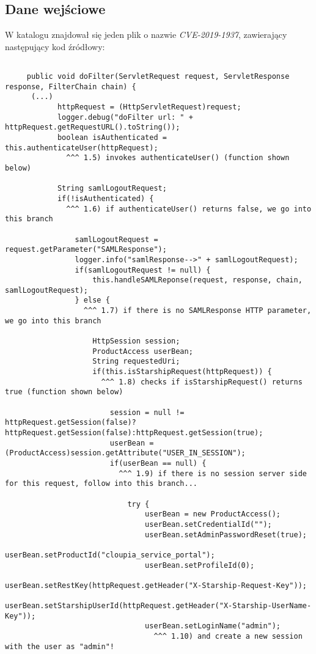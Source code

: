 \subsection{Dane wejściowe}
\label{subsec:dane_wejsciowe_i_oczekiwane_wyniki}
W katalogu znajdował się jeden plik o nazwie \textit{CVE-2019-1937}, zawierający następujący kod źródłowy:
\begin{listing}
    \begin{verbatim}
     
     public void doFilter(ServletRequest request, ServletResponse response, FilterChain chain) {
      (...)
            httpRequest = (HttpServletRequest)request;
            logger.debug("doFilter url: " + httpRequest.getRequestURL().toString());
            boolean isAuthenticated = this.authenticateUser(httpRequest);
              ^^^ 1.5) invokes authenticateUser() (function shown below)
              
            String samlLogoutRequest;
            if(!isAuthenticated) {
              ^^^ 1.6) if authenticateUser() returns false, we go into this branch
              
                samlLogoutRequest = request.getParameter("SAMLResponse");
                logger.info("samlResponse-->" + samlLogoutRequest);
                if(samlLogoutRequest != null) {
                    this.handleSAMLReponse(request, response, chain, samlLogoutRequest);
                } else {
                  ^^^ 1.7) if there is no SAMLResponse HTTP parameter, we go into this branch
                  
                    HttpSession session;
                    ProductAccess userBean;
                    String requestedUri;
                    if(this.isStarshipRequest(httpRequest)) {
                      ^^^ 1.8) checks if isStarshipRequest() returns true (function shown below)
                      
                        session = null != httpRequest.getSession(false)?httpRequest.getSession(false):httpRequest.getSession(true);
                        userBean = (ProductAccess)session.getAttribute("USER_IN_SESSION");
                        if(userBean == null) {
                          ^^^ 1.9) if there is no session server side for this request, follow into this branch...
                          
                            try {
                                userBean = new ProductAccess();
                                userBean.setCredentialId("");
                                userBean.setAdminPasswordReset(true);
                                userBean.setProductId("cloupia_service_portal");
                                userBean.setProfileId(0);
                                userBean.setRestKey(httpRequest.getHeader("X-Starship-Request-Key"));
                                userBean.setStarshipUserId(httpRequest.getHeader("X-Starship-UserName-Key"));
                                userBean.setLoginName("admin");
                                  ^^^ 1.10) and create a new session with the user as "admin"!
                                  

\end{verbatim}
\end{listing}
